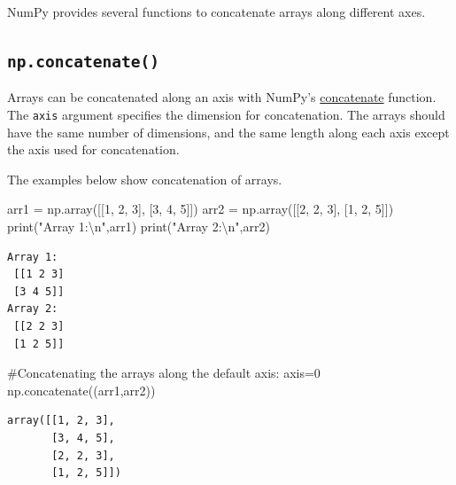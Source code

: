 \documentclass[
  letterpaper,
  DIV=11,
  numbers=noendperiod]{scrreprt}
\newenvironment{Shaded}{\begin{snugshade}}{\end{snugshade}}
\newcommand{\BuiltInTok}[1]{\textcolor[rgb]{0.00,0.23,0.31}{#1}}
\newcommand{\CharTok}[1]{\textcolor[rgb]{0.13,0.47,0.30}{#1}}
\newcommand{\CommentTok}[1]{\textcolor[rgb]{0.37,0.37,0.37}{#1}}
\newcommand{\DecValTok}[1]{\textcolor[rgb]{0.68,0.00,0.00}{#1}}
\newcommand{\NormalTok}[1]{\textcolor[rgb]{0.00,0.23,0.31}{#1}}
\newcommand{\OperatorTok}[1]{\textcolor[rgb]{0.37,0.37,0.37}{#1}}
\newcommand{\StringTok}[1]{\textcolor[rgb]{0.13,0.47,0.30}{#1}}
\begin{document}
NumPy provides several functions to concatenate arrays along different
axes.

\hypertarget{np.concatenate}{%
\subsection{\texorpdfstring{\texttt{np.concatenate()}}{np.concatenate()}}\label{np.concatenate}}

Arrays can be concatenated along an axis with NumPy's
\href{https://numpy.org/doc/stable/reference/generated/numpy.concatenate.html}{concatenate}
function. The \texttt{axis} argument specifies the dimension for
concatenation. The arrays should have the same number of dimensions, and
the same length along each axis except the axis used for concatenation.

The examples below show concatenation of arrays.

\begin{Shaded}
\begin{Highlighting}[]
\NormalTok{arr1 }\OperatorTok{=}\NormalTok{ np.array([[}\DecValTok{1}\NormalTok{, }\DecValTok{2}\NormalTok{, }\DecValTok{3}\NormalTok{], [}\DecValTok{3}\NormalTok{, }\DecValTok{4}\NormalTok{, }\DecValTok{5}\NormalTok{]])}
\NormalTok{arr2 }\OperatorTok{=}\NormalTok{ np.array([[}\DecValTok{2}\NormalTok{, }\DecValTok{2}\NormalTok{, }\DecValTok{3}\NormalTok{], [}\DecValTok{1}\NormalTok{, }\DecValTok{2}\NormalTok{, }\DecValTok{5}\NormalTok{]])}
\BuiltInTok{print}\NormalTok{(}\StringTok{"Array 1:}\CharTok{\textbackslash{}n}\StringTok{"}\NormalTok{,arr1)}
\BuiltInTok{print}\NormalTok{(}\StringTok{"Array 2:}\CharTok{\textbackslash{}n}\StringTok{"}\NormalTok{,arr2)}
\end{Highlighting}
\end{Shaded}

\begin{verbatim}
Array 1:
 [[1 2 3]
 [3 4 5]]
Array 2:
 [[2 2 3]
 [1 2 5]]
\end{verbatim}

\begin{Shaded}
\begin{Highlighting}[]
\CommentTok{\#Concatenating the arrays along the default axis: axis=0}
\NormalTok{np.concatenate((arr1,arr2))}
\end{Highlighting}
\end{Shaded}

\begin{verbatim}
array([[1, 2, 3],
       [3, 4, 5],
       [2, 2, 3],
       [1, 2, 5]])
\end{verbatim}
\end{document}
